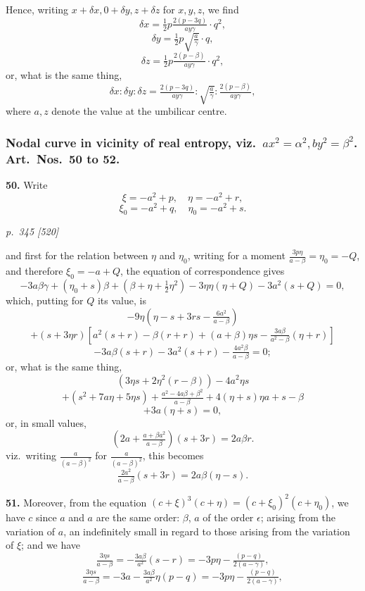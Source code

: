 \documentclass[11pt,a4paper]{article}
\theoremstyle{plain}
\theoremstyle{definition}
\begin{document}
Hence, writing $x + \delta x, 0 + \delta y, z + \delta z$ for $x, y, z$, we find
\[
\delta x = \tfrac{1}{2}p \tfrac{2(p - 3q)}{a y\gamma}\cdot q^2,
\]
\[
\delta y = \tfrac{1}{2}p\sqrt{\tfrac{a}{\gamma}}\cdot q,
\]
\[
\delta z = \tfrac{1}{2}p \tfrac{2(p - \beta)}{a y\gamma}\cdot q^2,
\]
or, what is the same thing,
\[
\delta x : \delta y : \delta z = \tfrac{2(p - 3q)}{a y\gamma} : \sqrt{\tfrac{a}{\gamma}} : \tfrac{2(p - \beta)}{a y\gamma},
\]
where $a, z$ denote the value at the umbilicar centre.

\subsubsection*{Nodal curve in vicinity of real entropy, viz.\ $a x^2 = \alpha^2, b y^2 = \beta^2$. Art.\ Nos.\ 50 to 52.}

\textbf{50.} Write
\[
\xi = -a^2 + p,\quad \eta = -a^2 + r,
\]
\[
\xi_0 = -a^2 + q,\quad \eta_0 = -a^2 + s.
\]

\clearpage

\bigskip
\textit{p.~345 [520]}
\smallskip

and first for the relation between $\eta$ and $\eta_0$, writing for a moment $\tfrac{3p\eta}{a - \beta} = \eta_0 = -Q$, and therefore $\xi_0 = -a + Q$, the equation of correspondence gives
\[
-3a\beta\gamma + (\eta_0 + s)\beta + (\beta + \eta + \tfrac{1}{2}\eta^2) - 3\eta\eta(\eta + Q) - 3a^2(s + Q) = 0,
\]
which, putting for $Q$ its value, is
\[
-9\eta(\eta - s + 3rs - \tfrac{6a^2}{a - \beta})
\]
\[
+ (s + 3\eta r)\!\left[a^2(s + r) - \beta(r + r) + (a + \beta)\eta s - \tfrac{3a\beta}{a^2 - \beta}(\eta + r)\right]
\]
\[
- 3a\beta(s + r) - 3a^2(s + r) - \tfrac{4a^2 \beta}{a - \beta} = 0;
\]
or, what is the same thing,
\[
(3\eta s + 2\eta^2(r - \beta)) - 4a^2\eta s
\]
\[
+ (s^2 + 7a\eta + 5\eta s) + \tfrac{a^2 - 4a\beta + \beta^2}{a - \beta} + 4(\eta + s)\eta a + s - \beta
\]
\[
+ 3a(\eta + s) = 0,
\]
or, in small values,
\[
\left(2a + \tfrac{a + \beta a^2}{a - \beta}\right)(s + 3r) = 2a\beta r.
\]
viz.\ writing $\tfrac{a}{(a - \beta)^2}$ for $\tfrac{a}{(a - \beta)^2}$, this becomes
\[
\tfrac{2a^2}{a - \beta}(s + 3r) = 2a\beta(\eta - s).
\]

\textbf{51.} Moreover, from the equation $(c + \xi)^3 (c + \eta) = (c + \xi_0)^2(c + \eta_0)$, we have $c$ since $a$ and $a$ are the same order: $\beta$, $a$ of the order $\epsilon$; arising from the variation of $a$, an indefinitely small in regard to those arising from the variation of $\xi$; and we have
\[
\tfrac{3\eta s}{a - \beta} = -\tfrac{3a\beta}{a^2}(s - r) = -3p\eta - \tfrac{(p - q)}{2(a - \gamma)},
\]
\[
\tfrac{3\eta s}{a - \beta} = -3a - \tfrac{3a\beta}{a^2}\eta(p - q) = -3p\eta - \tfrac{(p - q)}{2(a - \gamma)},
\]
\end{document}
